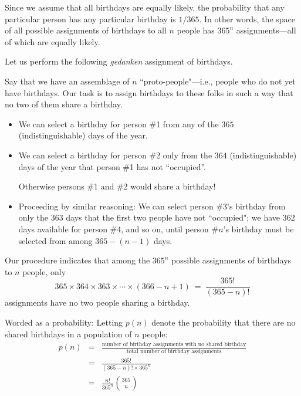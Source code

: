 \smallskip

Since we assume that all birthdays are equally likely, the probability that any particular person has any particular birthday is $1/365$.  In other words, the space of all possible assignments of birthdays to all $n$ people has $365^n$ assignments---all of which are equally likely.

\bigskip

Let us perform the following {\em gedanken} assignment of birthdays.

\smallskip

Say that we have an assemblage of $n$ ``proto-people"---i.e., people who do not yet have  birthdays.  Our task is to assign birthdays to these folks in such a way that no two of them share a birthday.
\begin{itemize}
\item
We can select a birthday for person \#1 from any of the $365$ (indistinguishable) days of the year.
\item
We can select a birthday for person \#2 only from the $364$ (indistinguishable) days of the year that person \#1 has not ``occupied''.

\smallskip

Otherwise persons \#1 and \#2 would share a birthday!
\item
Proceeding by similar reasoning:  We can select person \#3's birthday from only the $363$ days that the first two people have not ``occupied"; we have $362$ days available for person \#4, and so on, until person \#$n$'s birthday must be selected from among $365-(n-1)$ days.
\end{itemize}
Our procedure indicates that among the $365^n$ possible assignments of birthdays to $n$ people, only
\[ 365 \times 364 \times 363 \times \cdots \times (366-n+1) \ = \ \frac{365!}{(365-n)!}  \]
assignments have no two people sharing a birthday.

\smallskip

Worded as a probability: Letting $p(n)$ denote the probability that there are no shared birthdays in a population of $n$ people:
\begin{eqnarray*}
p(n) & = &
\frac{\mbox{number of birthday assignments with no shared birthday}}
{\mbox{total number of birthday assignments}} \\
 &  = & \frac{365!}{ (365-n)!  \times 365^n} \\
 & = & \frac{n!}{365^n} {365 \choose n}
\end{eqnarray*}

